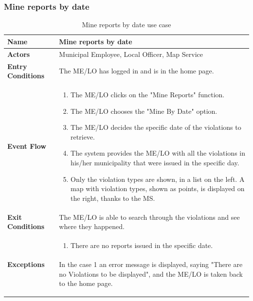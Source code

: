					\subsubsection{Mine reports by date}
					\begin{table}[!h]
						\centering
						\vspace{-2mm}
						\begin{tabular}{lp{}}
							\toprule
							\textbf{Name} & \textbf{Mine reports by date} \\[1mm]
							\midrule
							\textbf{Actors} & Municipal Employee, Local Officer, Map Service \\[1mm]
							\textbf{Entry Conditions} & The ME/LO has logged in and is in the home page. \vspace{1mm}\\
							\textbf{Event Flow} &
							\vspace{-5mm} 
							\begin{enumerate}
								\setlength\itemsep{0.2mm}
								\item The ME/LO clicks on the "Mine Reports" function.
								\item The ME/LO chooses the "Mine By Date" option.
								\item The ME/LO decides the specific date of the violations to retrieve.
								\item The system provides the ME/LO with all the violations in his/her municipality that were issued in the specific day.
								\item Only the violation types are shown, in a list on the left. A map with violation types, shown as points, is displayed on the right, thanks to the MS.
							\end{enumerate} \\
							\textbf{Exit Conditions} & The ME/LO is able to search through the violations and see where they happened. \vspace{1mm}\\
							\textbf{Exceptions} & 
								\vspace{-5mm} 
								\begin{enumerate}
									\item There are no reports issued in the specific date.
								\end{enumerate}
								\vspace{-7mm}
								\paragraph{}
									In the case 1 an error message is displayed, saying "There are no Violations to be displayed", and the ME/LO is taken back to the home page. \\
							\bottomrule
						\end{tabular}
						\caption{Mine reports by date use case}
					\end{table}
					\clearpage
